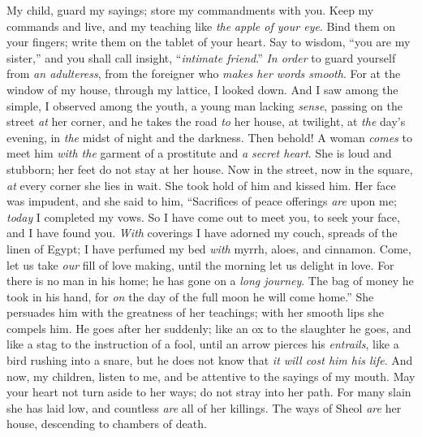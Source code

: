 \begin{biblechapter} %
 My child, guard my sayings; 
store my commandments with you.
\verse Keep my commands and live, 
and my teaching like \textit{the} \textit{apple of your eye}.
\verse Bind them on your fingers; 
write them on the tablet of your heart.
\verse Say to wisdom, “you are my sister,” 
and you shall call insight, “\textit{intimate friend}.”
\verse \textit{In order} to guard yourself from \textit{an adulteress}, 
from the foreigner who \textit{makes her words smooth}.
\verse For at the window of my house, 
through my lattice, I looked down.
\verse And I saw among the simple, 
I observed among the youth, 
a young man lacking \textit{sense},
\verse passing on the street \textit{at} her corner, 
and he takes the road \textit{to} her house,
\verse at twilight, at \textit{the} day’s evening, 
in \textit{the} midst of night and the darkness.
\verse Then behold! A woman \textit{comes} to meet him 
\textit{with the} garment of a prostitute and \textit{a secret heart}.
\verse She is loud and stubborn; 
her feet do not stay at her house.
\verse Now in the street, now in the square, 
\textit{at} every corner she lies in wait.
\verse She took hold of  him and kissed him. 
Her face was impudent, and she said to him,
\verse “Sacrifices of peace offerings \textit{are} upon me; 
\textit{today} I completed my vows.
\verse So I have come out to meet you, 
to seek your face, and I have found you.
\verse \textit{With} coverings I have adorned my couch, 
spreads of the linen of Egypt;
\verse I have perfumed my bed \textit{with} myrrh, 
aloes, and cinnamon.
\verse Come, let us take \textit{our} fill of love making, 
until the morning let us delight in love.
\verse For there is no man in his home; 
he has gone on a \textit{long journey}.
\verse The bag of money he took in his hand, 
for \textit{on} the day of the full moon he will come home.”
\verse She persuades him with the greatness of her teachings; 
with her smooth lips she compels him.
\verse He goes after her suddenly; 
like an ox to the slaughter he goes, 
and like a stag to the instruction of a fool,
\verse until an arrow pierces his \textit{entrails}, 
like a bird rushing into a snare, 
but he does not know that \textit{it will cost him his life}.
 And now, my children, listen to me, 
and be attentive to the sayings of my mouth.
\verse May your heart not turn aside to her ways; 
do not stray into her path.
\verse For many slain she has laid low, 
and countless \textit{are} all of her killings.
\verse The ways of Sheol \textit{are} her house, 
descending to chambers of death.
\end{biblechapter}


